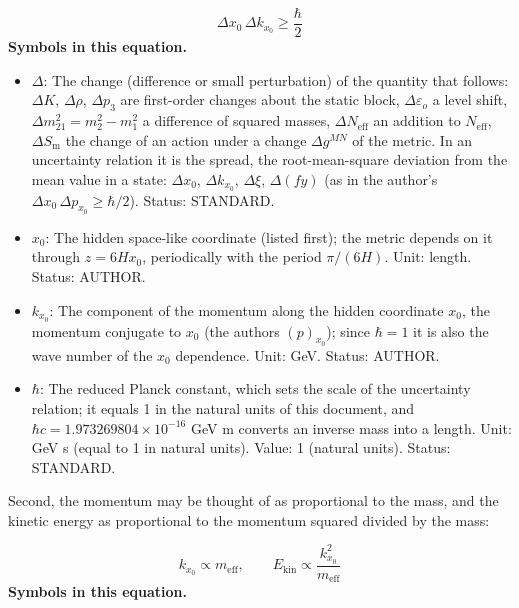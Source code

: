 \documentclass[
  10pt,
]{article}
\providecommand{\tightlist}{%
  \setlength{\itemsep}{0pt}\setlength{\parskip}{0pt}}
\begin{document}
\[ \Delta x_0\,\Delta k_{x_0} \ge \frac{\hbar}{2} \] \textbf{Symbols in
this equation.}

\begin{itemize}
\tightlist
\item
  \(\Delta\): The change (difference or small perturbation) of the
  quantity that follows: \(\Delta K\), \(\Delta\rho\), \(\Delta p_3\)
  are first-order changes about the static block,
  \(\Delta\varepsilon_o\) a level shift,
  \(\Delta m^2_{21} = m_2^2 - m_1^2\) a difference of squared masses,
  \(\Delta N_{\mathrm{eff}}\) an addition to \(N_{\mathrm{eff}}\),
  \(\Delta S_{\mathrm{m}}\) the change of an action under a change
  \(\Delta g^{MN}\) of the metric. In an uncertainty relation it is the
  spread, the root-mean-square deviation from the mean value in a state:
  \(\Delta x_0\), \(\Delta k_{x_0}\), \(\Delta\xi\), \(\Delta(fy)\) (as
  in the author's \(\Delta x_0\,\Delta p_{x_0} \ge \hbar/2\)). Status:
  STANDARD.
\item
  \(x_0\): The hidden space-like coordinate (listed first); the metric
  depends on it through \(z = 6Hx_0\), periodically with the period
  \(\pi/(6H)\). Unit: length. Status: AUTHOR.
\item
  \(k_{x_0}\): The component of the momentum along the hidden coordinate
  \(x_0\), the momentum conjugate to \(x_0\) (the
  author\textquotesingle s \((p)_{x_0}\)); since \(\hbar = 1\) it is
  also the wave number of the \(x_0\) dependence. Unit: GeV. Status:
  AUTHOR.
\item
  \(\hbar\): The reduced Planck constant, which sets the scale of the
  uncertainty relation; it equals 1 in the natural units of this
  document, and \(\hbar c = 1.973269804\times10^{-16}\) GeV m converts
  an inverse mass into a length. Unit: GeV s (equal to 1 in natural
  units). Value: 1 (natural units). Status: STANDARD.
\end{itemize}

Second, the momentum may be thought of as proportional to the mass, and
the kinetic energy as proportional to the momentum squared divided by
the mass:

\[ k_{x_0} \propto m_{\mathrm{eff}},\qquad E_{\mathrm{kin}} \propto \frac{k_{x_0}^2}{m_{\mathrm{eff}}} \]
\textbf{Symbols in this equation.}
\end{document}
